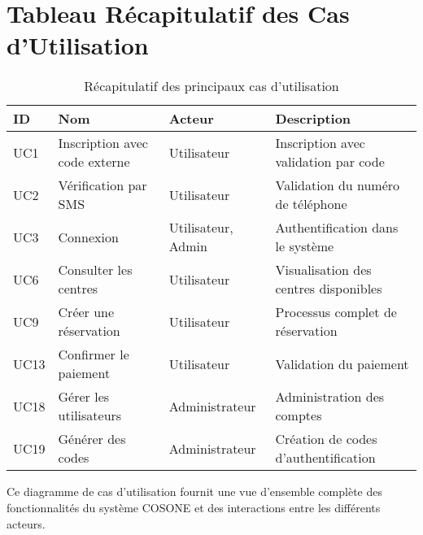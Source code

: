 \documentclass[12pt,a4paper]{article}
\begin{document}
\section{Tableau Récapitulatif des Cas d'Utilisation}

\begin{table}[h]
\centering
\begin{tabular}{|l|l|l|p{6cm}|}
\hline
\textbf{ID} & \textbf{Nom} & \textbf{Acteur} & \textbf{Description} \\
\hline
UC1 & Inscription avec code externe & Utilisateur & Inscription avec validation par code \\
\hline
UC2 & Vérification par SMS & Utilisateur & Validation du numéro de téléphone \\
\hline
UC3 & Connexion & Utilisateur, Admin & Authentification dans le système \\
\hline
UC6 & Consulter les centres & Utilisateur & Visualisation des centres disponibles \\
\hline
UC9 & Créer une réservation & Utilisateur & Processus complet de réservation \\
\hline
UC13 & Confirmer le paiement & Utilisateur & Validation du paiement \\
\hline
UC18 & Gérer les utilisateurs & Administrateur & Administration des comptes \\
\hline
UC19 & Générer des codes & Administrateur & Création de codes d'authentification \\
\hline
\end{tabular}
\caption{Récapitulatif des principaux cas d'utilisation}
\end{table}

Ce diagramme de cas d'utilisation fournit une vue d'ensemble complète des fonctionnalités du système COSONE et des interactions entre les différents acteurs.
\end{document}
